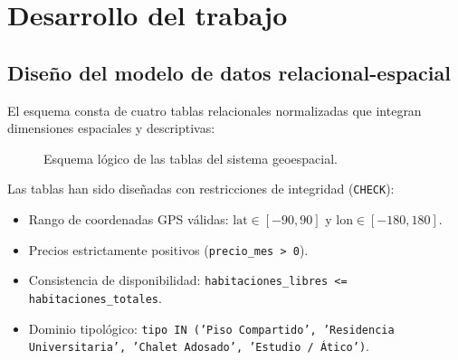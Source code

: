 \documentclass[a4paper,12pt]{article}
\begin{document}
\section{Desarrollo del trabajo}

\subsection{Diseño del modelo de datos relacional-espacial}
El esquema consta de cuatro tablas relacionales normalizadas que integran dimensiones espaciales y descriptivas:

\begin{figure}[H]
  \centering
  \caption{Esquema lógico de las tablas del sistema geoespacial.}
  \label{fig:esquema}
\end{figure}

Las tablas han sido diseñadas con restricciones de integridad (\texttt{CHECK}):
\begin{itemize}[leftmargin=1.0cm]
  \item Rango de coordenadas GPS válidas: $\text{lat} \in [-90, 90]$ y $\text{lon} \in [-180, 180]$.
  \item Precios estrictamente positivos (\texttt{precio\_mes > 0}).
  \item Consistencia de disponibilidad: \texttt{habitaciones\_libres <= habitaciones\_totales}.
  \item Dominio tipológico: \texttt{tipo IN ('Piso Compartido', 'Residencia Universitaria', 'Chalet Adosado', 'Estudio / Ático')}.
\end{itemize}
\end{document}
